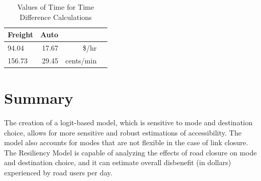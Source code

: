 \begin{table}


\caption{\label{tab:VOT}Values of Time for Time Difference Calculations}
\centering
\begin{tabular}[t]{lrrr}
\toprule
Freight & Auto \\
\midrule
94.04 & 17.67 & \$/hr\\
156.73 & 29.45 & cents/min\\
\bottomrule
\end{tabular}
\end{table}

\section{Summary}

The creation of a logit-based model, which is sensitive to mode and destination
choice, allows for more sensitive and robust estimations of accessibility. The
model also accounts for modes that are not flexible in the case of link
closure. The Resiliency Model is capable of analyzing the effects of
road closure on mode and destination choice, and it can estimate overall 
disbenefit (in dollars) experienced by road users per day.
